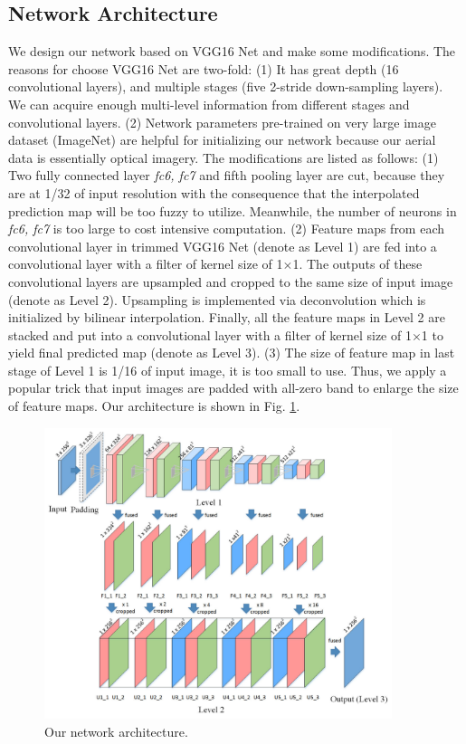 \documentclass[runningheads]{llncs}
\begin{document}
\subsection{Network Architecture} 
   We design our network based on VGG16 Net \cite{Simonyan2014Very} and make some modifications. The reasons for choose VGG16 Net are two-fold: (1) It has great depth (16 convolutional layers), and multiple stages (five 2-stride down-sampling layers). We can acquire enough multi-level information from different stages and convolutional layers. (2) Network parameters pre-trained on very large image dataset (ImageNet) are helpful for initializing our network  because our aerial data is essentially optical imagery.  The modifications are listed as follows: (1) Two fully connected layer \textit{fc6, fc7} and fifth pooling layer are cut, because they are at 1/32 of input resolution with the consequence that the interpolated prediction map will be too fuzzy to utilize. Meanwhile, the number of neurons in \textit{fc6, fc7} is too large to cost intensive computation. (2) Feature maps from each convolutional layer in trimmed VGG16 Net (denote as Level 1) are fed into a convolutional layer with a filter of kernel size of 1$\times$1. The outputs of these convolutional layers are upsampled and cropped to the same size of input image (denote as Level 2). Upsampling is implemented via deconvolution which is initialized by bilinear interpolation.  Finally, all the  feature maps in Level 2 are stacked and put into a convolutional layer with  a filter of kernel size of 1$\times$1  to yield final predicted map (denote as Level 3). (3) The  size of  feature map in last stage of Level 1 is 1/16 of input image, it is too small to use. Thus, we apply a popular trick that  input images are padded with all-zero band to enlarge the size of feature maps. Our architecture is shown in Fig. \ref{fig:hierarchicalFCN}.
 
\begin{figure}
\centering
\includegraphics[height=85mm]{hierarchicalFCN9}
\caption{Our network architecture.}
\label{fig:hierarchicalFCN}
\end{figure}
\end{document}
